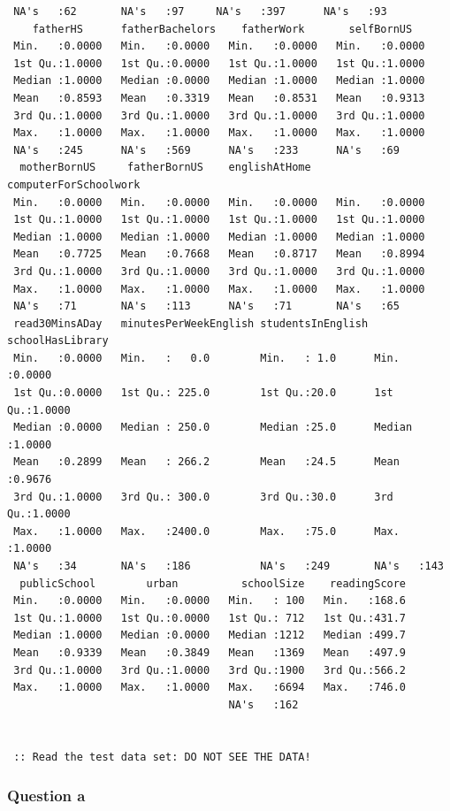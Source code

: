 \documentclass[letterpaper, 9pt, onecolumn, twoside, technote, final]{IEEEtran}
\begin{document}
\begin{verbatim}
 NA's   :62       NA's   :97     NA's   :397      NA's   :93
    fatherHS      fatherBachelors    fatherWork       selfBornUS
 Min.   :0.0000   Min.   :0.0000   Min.   :0.0000   Min.   :0.0000
 1st Qu.:1.0000   1st Qu.:0.0000   1st Qu.:1.0000   1st Qu.:1.0000
 Median :1.0000   Median :0.0000   Median :1.0000   Median :1.0000
 Mean   :0.8593   Mean   :0.3319   Mean   :0.8531   Mean   :0.9313
 3rd Qu.:1.0000   3rd Qu.:1.0000   3rd Qu.:1.0000   3rd Qu.:1.0000
 Max.   :1.0000   Max.   :1.0000   Max.   :1.0000   Max.   :1.0000
 NA's   :245      NA's   :569      NA's   :233      NA's   :69
  motherBornUS     fatherBornUS    englishAtHome    computerForSchoolwork
 Min.   :0.0000   Min.   :0.0000   Min.   :0.0000   Min.   :0.0000
 1st Qu.:1.0000   1st Qu.:1.0000   1st Qu.:1.0000   1st Qu.:1.0000
 Median :1.0000   Median :1.0000   Median :1.0000   Median :1.0000
 Mean   :0.7725   Mean   :0.7668   Mean   :0.8717   Mean   :0.8994
 3rd Qu.:1.0000   3rd Qu.:1.0000   3rd Qu.:1.0000   3rd Qu.:1.0000
 Max.   :1.0000   Max.   :1.0000   Max.   :1.0000   Max.   :1.0000
 NA's   :71       NA's   :113      NA's   :71       NA's   :65
 read30MinsADay   minutesPerWeekEnglish studentsInEnglish schoolHasLibrary
 Min.   :0.0000   Min.   :   0.0        Min.   : 1.0      Min.   :0.0000
 1st Qu.:0.0000   1st Qu.: 225.0        1st Qu.:20.0      1st Qu.:1.0000
 Median :0.0000   Median : 250.0        Median :25.0      Median :1.0000
 Mean   :0.2899   Mean   : 266.2        Mean   :24.5      Mean   :0.9676
 3rd Qu.:1.0000   3rd Qu.: 300.0        3rd Qu.:30.0      3rd Qu.:1.0000
 Max.   :1.0000   Max.   :2400.0        Max.   :75.0      Max.   :1.0000
 NA's   :34       NA's   :186           NA's   :249       NA's   :143
  publicSchool        urban          schoolSize    readingScore
 Min.   :0.0000   Min.   :0.0000   Min.   : 100   Min.   :168.6
 1st Qu.:1.0000   1st Qu.:0.0000   1st Qu.: 712   1st Qu.:431.7
 Median :1.0000   Median :0.0000   Median :1212   Median :499.7
 Mean   :0.9339   Mean   :0.3849   Mean   :1369   Mean   :497.9
 3rd Qu.:1.0000   3rd Qu.:1.0000   3rd Qu.:1900   3rd Qu.:566.2
 Max.   :1.0000   Max.   :1.0000   Max.   :6694   Max.   :746.0
                                   NA's   :162


 :: Read the test data set: DO NOT SEE THE DATA!
\end{verbatim}

\subsubsection{Question a}
\label{sec-2-1-3}
\end{document}
